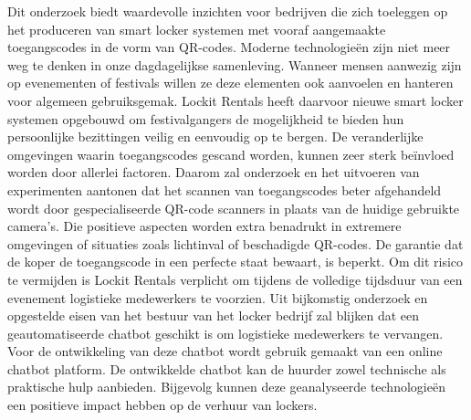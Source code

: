 Dit onderzoek biedt waardevolle inzichten voor bedrijven die zich toeleggen op het produceren van smart locker systemen met vooraf aangemaakte toegangscodes in de vorm van QR-codes. Moderne technologieën zijn niet meer weg te denken in onze dagdagelijkse samenleving. Wanneer mensen aanwezig zijn op evenementen of festivals willen ze deze elementen ook aanvoelen en hanteren voor algemeen gebruiksgemak. Lockit Rentals heeft daarvoor nieuwe smart locker systemen opgebouwd om festivalgangers de mogelijkheid te bieden hun persoonlijke bezittingen veilig en eenvoudig op te bergen. De veranderlijke omgevingen waarin toegangscodes gescand worden, kunnen zeer sterk beïnvloed worden door allerlei factoren. Daarom zal onderzoek en het uitvoeren van experimenten aantonen dat het scannen van toegangscodes beter afgehandeld wordt door gespecialiseerde QR-code scanners in plaats van de huidige gebruikte camera’s. Die positieve aspecten worden extra benadrukt in extremere omgevingen of situaties zoals lichtinval of beschadigde QR-codes. De garantie dat de koper de toegangscode in een perfecte staat bewaart, is beperkt. Om dit risico te vermijden is Lockit Rentals verplicht om tijdens de volledige tijdsduur van een evenement logistieke medewerkers te voorzien. Uit bijkomstig onderzoek en opgestelde eisen van het bestuur van het locker bedrijf zal blijken dat een geautomatiseerde chatbot geschikt is om logistieke medewerkers te vervangen. Voor de ontwikkeling van deze chatbot wordt gebruik gemaakt van een online chatbot platform. De ontwikkelde chatbot kan de huurder zowel technische als praktische hulp aanbieden. Bijgevolg kunnen deze geanalyseerde technologieën een positieve impact hebben op de verhuur van lockers. 

